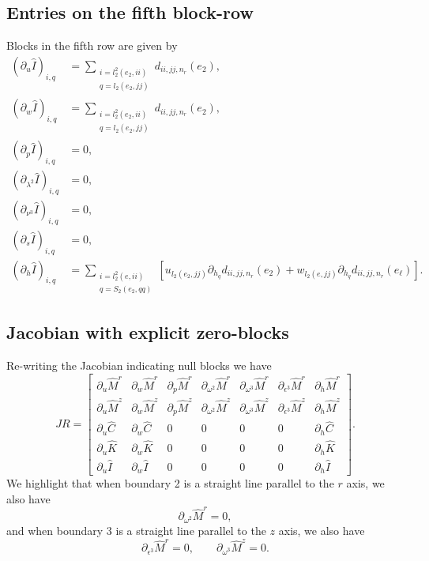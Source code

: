 \documentclass{article}
\begin{document}
\subsection{Entries on the fifth block-row}
Blocks in the fifth row are given by
\begin{align}
\left(\partial_u \hat{I}\right)_{i,q} &= \sum_{\substack{i=l_2^2(e_2,ii)\\ q=l_2(e_2,jj)}} d_{ii,jj,n_r}(e_2), \tag{18.30}\\
\left(\partial_w \hat{I}\right)_{i,q} &= \sum_{\substack{i=l_2^2(e_2,ii)\\ q=l_2(e_2,jj)}} d_{ii,jj,n_r}(e_2), \tag{18.31}\\
\left(\partial_p \hat{I}\right)_{i,q} &= 0, \tag{18.32}\\
\left(\partial_{\lambda^2} \hat{I}\right)_{i,q} &= 0, \tag{18.33}\\
\left(\partial_{\nu^3} \hat{I}\right)_{i,q} &= 0, \tag{18.34}\\
\left(\partial_s \hat{I}\right)_{i,q} &= 0, \tag{18.35}\\
\left(\partial_h \hat{I}\right)_{i,q} &= \sum_{\substack{i=l_2^2(e,ii)\\ q=S_2(e_2,qq)}} \left[ u_{l_2(e_2,jj)} \partial_{h_q} d_{ii,jj,n_r}(e_2) + w_{l_2(e,jj)} \partial_{h_q} d_{ii,jj,n_r}(e_\ell) \right]. \tag{18.36}
\end{align}

\subsection{Jacobian with explicit zero-blocks}
Re-writing the Jacobian indicating null blocks we have
\begin{equation}
JR =
\begin{bmatrix}
\partial_u \hat{M}^r & \partial_w \hat{M}^r & \partial_p \hat{M}^r & \partial_{\omega^2} \hat{M}^r & \partial_{\omega^3} \hat{M}^r & \partial_{\epsilon^3} \hat{M}^r & \partial_h \hat{M}^r \\
\partial_u \hat{M}^z & \partial_w \hat{M}^z & \partial_p \hat{M}^z & \partial_{\omega^2} \hat{M}^z & \partial_{\omega^3} \hat{M}^z & \partial_{\epsilon^3} \hat{M}^z & \partial_h \hat{M}^z \\
\partial_u \hat{C}   & \partial_w \hat{C}   & 0 & 0 & 0 & 0 & \partial_h \hat{C}   \\
\partial_u \hat{K}   & \partial_w \hat{K}   & 0 & 0 & 0 & 0 & \partial_h \hat{K}   \\
\partial_u \hat{I}   & \partial_w \hat{I}   & 0 & 0 & 0 & 0 & \partial_h \hat{I}   
\end{bmatrix}. \tag{18.37}
\end{equation}
We highlight that when boundary 2 is a straight line parallel to the \(r\) axis, we also have
\begin{equation}
\partial_{\omega^2} \hat{M}^r = 0, \tag{18.38}
\end{equation}
and when boundary 3 is a straight line parallel to the \(z\) axis, we also have
\begin{equation}
\partial_{\epsilon^3} \hat{M}^r = 0, \qquad \partial_{\omega^3} \hat{M}^z = 0. \tag{18.39-40}
\end{equation}
\end{document}
